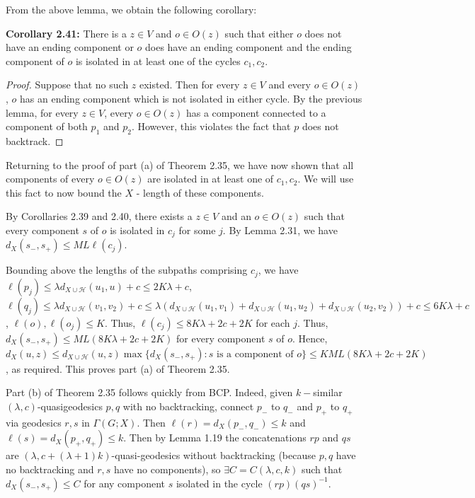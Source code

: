 \documentclass[12pt]{article}
\newcommand{\vs}{\vskip10pt}
\begin{document}
	From the above lemma, we obtain the following corollary: 
	
	\vs 
	
	\textbf{Corollary 2.41: } There is a $z \in V$ and $o \in O(z)$ such that either $o$ does not have an ending component or $o$ does have an ending component and the ending component of $o$ is isolated in at least one of the cycles $c_1,c_2$.
	
	\begin{proof}
		
		Suppose that no such $z$ existed. Then for every $z \in V$ and every $o \in O(z)$, $o$ has an ending component which is not isolated in either cycle. By the previous lemma, for every $z \in V$, every $o \in O(z)$ has a component connected to a component of both $p_1$ and $p_2$. However, this violates the fact that $p$ does not backtrack. 
		
	\end{proof}

	Returning to the proof of part (a) of Theorem 2.35, we have now shown that all components of every $o \in O(z)$ are isolated in at least one of $c_1, c_2$. We will use this fact to now bound the $X$ - length of these components. 
	
	\vs 
	
	By Corollaries 2.39 and 2.40, there exists a $z \in V$ and an $o \in O(z)$ such that every component $s$ of $o$ is isolated in $c_j$ for some $j$. By Lemma 2.31, we have $d_X(s_-, s_+) \leq ML \ell(c_j)$. 
	
	\vs 
	
	Bounding above the lengths of the subpaths comprising $c_j$, we have $\ell(p_j) \leq \lambda d_{X \cup \mathcal{H}}(u_1, u) + c \leq 2K\lambda + c$, $\ell(q_j) \leq \lambda d_{X \cup \mathcal{H}}(v_1, v_2) + c \leq \lambda (d_{X \cup \mathcal{H}}(u_1, v_1) + d_{X \cup \mathcal{H}}(u_1, u_2) + d_{X \cup \mathcal{H}}(u_2, v_2)) + c \leq 6 K \lambda + c$, $\ell(o), \ell(o_j) \leq K$. Thus, $\ell(c_j) \leq 8K \lambda + 2c + 2K$ for each $j$.  Thus, $d_X(s_-, s_+) \leq ML(8K \lambda + 2c + 2K)$ for every component $s$ of $o$. Hence, $d_X(u,z) \leq d_{X \cup \mathcal{H}}(u,z) \max \{d_X(s_-, s_+): s \text{ is a component of } o\}\leq K ML(8K \lambda + 2c + 2K)$, as required. This proves part (a) of Theorem 2.35. 
	
	\vs
	
	Part (b) of Theorem 2.35 follows quickly from BCP. Indeed, given $k-$similar $(\lambda, c)$-quasigeodesics $p,q$ with no backtracking, connect $p_-$ to $q_-$ and $p_+$ to $q_+$ via geodesics $r,s$ in $\Gamma(G;X)$. Then $\ell(r) = d_X(p_-, q_-) \leq k$ and $\ell(s) = d_X(p_+, q_+) \leq k$. Then by Lemma 1.19 the concatenations $rp$ and $qs$ are $(\lambda, c + (\lambda + 1)k)$-quasi-geodesics without backtracking (because $p,q$ have no backtracking and $r,s$ have no components), so $\exists C = C(\lambda, c, k)$ such that $d_X(s_-, s_+) \leq C$ for any component $s$ isolated in the cycle $(rp)(qs)^{-1}$. 
	
\end{document}
